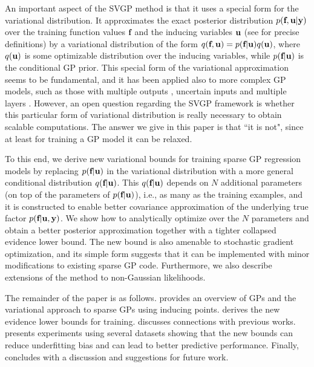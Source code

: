 An important aspect of the SVGP method is that it uses a special form for the variational distribution. It approximates the exact posterior distribution 
$p(\textbf{f}, \textbf{u} | \textbf{y})$ over the training function values $\textbf{f}$ and the
inducing variables $\textbf{u}$ 
(see  for precise definitions)
by a variational distribution of the form $q(\textbf{f}, \textbf{u}) = p(\textbf{f} | \textbf{u}) q(\textbf{u})$, where
$q(\textbf{u})$ is some optimizable  distribution over the inducing variables, while
$p(\textbf{f} | \textbf{u})$ is the conditional GP prior. 
This special form of the variational approximation seems to be fundamental, and it has been applied also to more complex GP models, such as those with multiple outputs 
\cite{alvarez10a,NguyenBonilla14,fariba19}, uncertain inputs \cite{titsias10a} and multiple layers \cite{damianou13a,salimbeni2017doubly}. However, an open question regarding
the SVGP framework is whether this particular form of variational distribution
is really necessary to obtain scalable computations. The answer we give in this paper is that “it is not", since at least for training a GP model it can be relaxed. 

To this end, we derive new variational bounds for training 
sparse GP regression models by replacing 
$p(\textbf{f} |\textbf{u})$ in the variational distribution with a more general conditional distribution $q(\textbf{f} | \textbf{u})$. This $q(\textbf{f} | \textbf{u})$ depends on $N$ additional parameters (on top of the parameters of $p(\textbf{f} | \textbf{u})$), i.e., as many as the training examples, and it is constructed to enable better covariance approximation of the underlying true factor $p(\textbf{f} | \textbf{u}, \textbf{y})$. We show how to analytically optimize over the $N$ parameters and obtain a better posterior approximation together with a tighter 
collapsed evidence lower bound. 
The new bound is also amenable to stochastic gradient optimization, and its
simple form suggests that  it can be implemented with minor modifications to existing sparse GP code. Furthermore, we also describe extensions of the method to non-Gaussian likelihoods.


The remainder of the paper is as follows.  provides 
an overview of GPs and the variational approach to sparse GPs using inducing points.  
derives the new evidence lower bounds for training.  discusses connections with previous works. %
 presents experiments using several %
datasets showing that the new bounds can reduce underfitting bias and can lead to better predictive performance. Finally,  
concludes with a discussion and suggestions for future work.   
 





